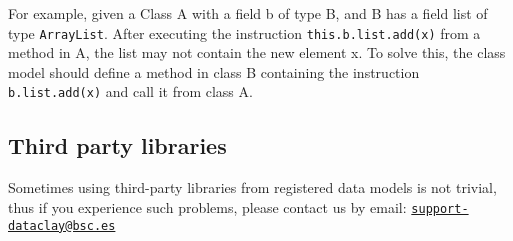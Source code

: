 For example, given a Class A with a field b of type B, and B has a field list of type \texttt{ArrayList}. After executing the instruction \texttt{this.b.list.add(x)} from a method in A, the list may not contain the new element x. To solve this, the class model should define a method in class B containing the instruction \texttt{b.list.add(x)} and call it from class A.

\subsection{Third party libraries}

Sometimes using third-party libraries from registered data models is not trivial, thus if you experience such problems, please contact us by email: \texttt{\href{mailto:support-dataclay@bsc.es}{support-dataclay@bsc.es}}

\FILTERING{

}
